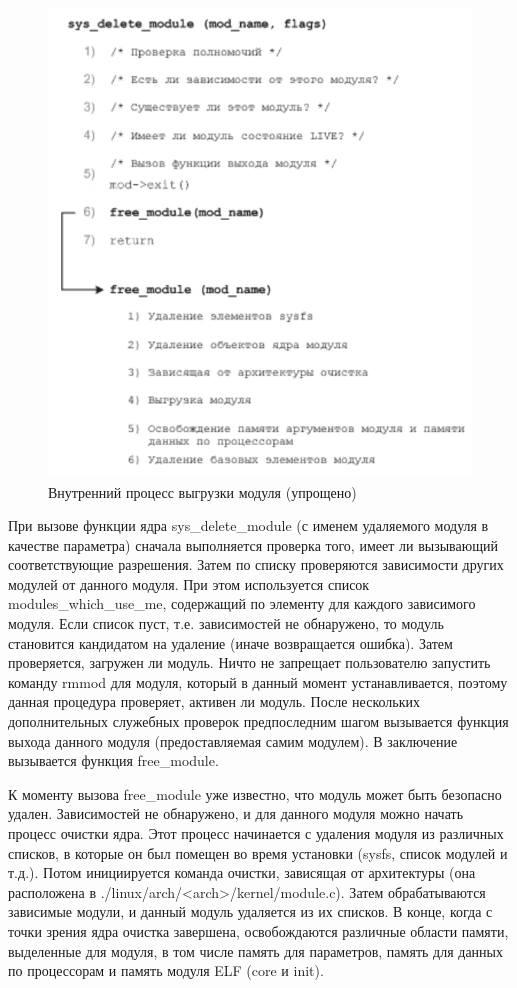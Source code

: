 \begin{figure}[H]
	\centering
	\includegraphics[width=0.7\linewidth]{src/img/uload_core}
	\caption{Внутренний процесс выгрузки модуля (упрощено)}
	\label{fig:uloadcore}
\end{figure}

При вызове функции ядра sys\_delete\_module (с именем удаляемого модуля в качестве параметра) сначала выполняется проверка того, имеет ли вызывающий соответствующие разрешения. Затем по списку проверяются зависимости других модулей от данного модуля. 
При этом используется список modules\_which\_use\_me, содержащий по элементу для каждого зависимого модуля. 
Если список пуст, т.е. зависимостей не обнаружено, то модуль становится кандидатом на удаление (иначе возвращается ошибка). 
Затем проверяется, загружен ли модуль. 
Ничто не запрещает пользователю запустить команду rmmod для модуля, который в данный момент устанавливается, поэтому данная процедура проверяет, активен ли модуль. 
После нескольких дополнительных служебных проверок предпоследним шагом вызывается функция выхода данного модуля (предоставляемая самим модулем). 
В заключение вызывается функция free\_module.

К моменту вызова free\_module уже известно, что модуль может быть безопасно удален. 
Зависимостей не обнаружено, и для данного модуля можно начать процесс очистки ядра. 
Этот процесс начинается с удаления модуля из различных списков, в которые он был помещен во время установки (sysfs, список модулей и т.д.). 
Потом инициируется команда очистки, зависящая от архитектуры (она расположена в ./linux/arch/<arch>/kernel/module.c). 
Затем обрабатываются зависимые модули, и данный модуль удаляется из их списков. 
В конце, когда с точки зрения ядра очистка завершена, освобождаются различные области памяти, выделенные для модуля, в том числе память для параметров, память для данных по процессорам и память модуля ELF (core и init).



